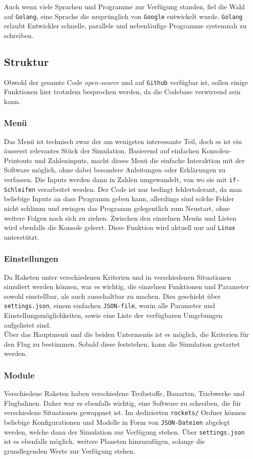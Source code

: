 \documentclass[11pt]{article}
\begin{document}
Auch wenn viele Sprachen und Programme zur Verfügung standen, fiel die Wahl auf
\texttt{Golang}, eine Sprache die ursprünglich von \texttt{Google} entwickelt wurde. \texttt{Golang}
erlaubt Entwickler schnelle, parallele und nebenläufige Programme systemnah zu
schreiben.
\subsection{Struktur}
\label{sec:orgd98cea6}
Obwohl der gesamte Code \emph{open-source} und auf \texttt{Github} verfügbar ist, sollen einige
Funktionen hier trotzdem besprochen werden, da die Codebase verwirrend sein
kann.
\subsubsection{Menü}
\label{sec:org8a266e0}
Das Menü ist technisch zwar der am wenigsten interessante Teil, doch es ist ein
äusserst relevantes Stück der Simulation. Basierend auf einfachen
Konsolen-Printouts und Zahleninputs, macht dieses Menü die einfache Interaktion
mit der Software möglich, ohne dabei besondere Anleitungen oder Erklärungen zu
verfassen. Die Inputs werden dann in Zahlen umgewandelt, von wo sie mit
\texttt{if-Schleifen} verarbeitet werden. Der Code ist nur bedingt fehlertolerant, da man
beliebige Inputs an dass Programm geben kann, allerdings sind solche Fehler
nicht schlimm und zwingen das Programm gelegentlich zum Neustart, ohne weitere
Folgen nach sich zu ziehen. Zwischen den einzelnen Menüs und Listen wird
ebenfalls die Konsole geleert. Diese Funktion wird aktuell nur auf \texttt{Linux}
unterstützt.
\subsubsection{Einstellungen}
\label{sec:org4eeacab}
Da Raketen unter verschiedenen Kriterien und in verschiedenen Situationen
simuliert werden können, war es wichtig, die einzelnen Funktionen und Parameter
sowohl einstellbar, als auch ausschaltbar zu machen. Dies geschieht über
\texttt{settings.json}, einem einfachen \texttt{JSON-file}, worin alle Parameter und
Einstellungsmöglichkeiten, sowie eine Liste der verfügbaren Umgebungen
aufgelistet sind.\\
Über das Hauptmenü und die beiden Untermenüs ist es möglich, die Kriterien für
den Flug zu bestimmen. Sobald diese feststehen, kann die Simulation gestartet
werden.
\subsubsection{Module}
\label{sec:org6b732d6}
Verschiedene Raketen haben verschiedene Treibstoffe, Bauarten, Triebwerke und
Flugbahnen. Daher war es ebenfalls wichtig, eine Software zu schreiben, die für
verschiedene Situationen gewappnet ist. Im dedizierten \texttt{rockets/} Ordner können
beliebige Konfigurationen und Modelle in Form von \texttt{JSON-Dateien} abgelegt werden,
welche dann der Simulation zur Verfügung stehen. Über \texttt{settings.json} ist es
ebenfalls möglich, weitere Planeten hinzuzufügen, solange die grundlegenden
Werte zur Verfügung stehen.
\end{document}
